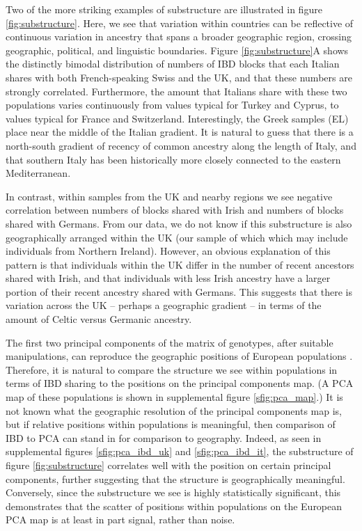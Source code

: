 \documentclass{article}
\begin{document}
Two of the more striking examples of substructure are illustrated in figure \ref{fig:substructure}.
Here, we see that variation within countries can be reflective of continuous variation in ancestry that spans a broader geographic region,
crossing geographic, political, and linguistic boundaries.
Figure \ref{fig:substructure}A shows the distinctly bimodal distribution of numbers of IBD blocks
that each Italian shares with both French-speaking Swiss and the UK,
and that these numbers are strongly correlated.
Furthermore, the amount that Italians share with these two populations varies continuously
from values typical for Turkey and Cyprus, to values typical for France and Switzerland.
Interestingly, the Greek samples (EL) place near the middle of the Italian gradient.
It is natural to guess that there is a north-south gradient of recency of common ancestry
along the length of Italy, and that southern Italy has been historically more closely connected to the eastern Mediterranean.

In contrast, within samples from the UK and nearby regions
we see negative correlation between numbers of blocks shared with Irish and numbers of blocks shared with Germans.
From our data, we do not know if this substructure is also geographically arranged within the UK (our sample of which which may include individuals from Northern Ireland).
However, an obvious explanation of this pattern is that individuals within the UK differ in the number of recent ancestors shared with Irish, 
and that individuals with less Irish ancestry have a larger portion of their recent ancestry shared with Germans.
This suggests that there is variation across the UK 
-- perhaps a geographic gradient -- 
in terms of the amount of Celtic versus Germanic ancestry.



The first two principal components of the matrix of genotypes,
after suitable manipulations, can reproduce the geographic positions
of European populations
\citep[e.g.][]{menozzi1978synthetic,novembre2008europe,lao2008correlation}.
Therefore, it is natural to compare the structure we see within populations in terms of IBD sharing 
to the positions on the principal components map.
(A PCA map of these populations \citep[produced by EIGENSTRAT,][]{price2006eigenstrat} is shown in supplemental figure \ref{sfig:pca_map}.)
It is not known what the geographic resolution of the principal components map is,
but if relative positions within populations is meaningful,
then comparison of IBD to PCA can stand in for comparison to geography.
Indeed, as seen in supplemental figures \ref{sfig:pca_ibd_uk} and \ref{sfig:pca_ibd_it},
the substructure of figure \ref{fig:substructure} correlates well with the position on certain principal components,
further suggesting that the structure is geographically meaningful.
Conversely, since the substructure we see is highly statistically significant,
this demonstrates that the scatter of positions within populations on
the European PCA map is at least in part signal, rather than noise.
\end{document}
